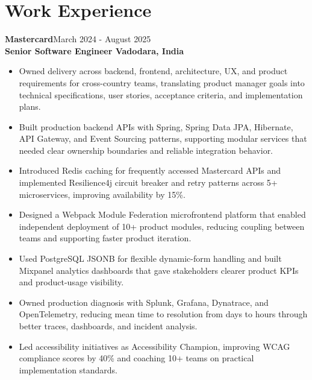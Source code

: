 \documentclass[10pt,a4paper]{article}
\newcommand{\entry}[4]{%
  \textbf{\color{secondarycolor}#1}\hfill {\small\color{mutedcolor}#2}\\
  \textbf{#3}\hfill {\small\color{mutedcolor}#4}\\[-5pt]
}
\begin{document}
\section*{Work Experience}
\entry{Mastercard}{March 2024 - August 2025}{Senior Software Engineer \textbar{} Vadodara, India}{}
\begin{itemize}
  \item Owned delivery across backend, frontend, architecture, UX, and product requirements for cross-country teams, translating product manager goals into technical specifications, user stories, acceptance criteria, and implementation plans.
  \item Built production backend APIs with Spring, Spring Data JPA, Hibernate, API Gateway, and Event Sourcing patterns, supporting modular services that needed clear ownership boundaries and reliable integration behavior.
  \item Introduced Redis caching for frequently accessed Mastercard APIs and implemented Resilience4j circuit breaker and retry patterns across 5+ microservices, improving availability by 15\%.
  \item Designed a Webpack Module Federation microfrontend platform that enabled independent deployment of 10+ product modules, reducing coupling between teams and supporting faster product iteration.
  \item Used PostgreSQL JSONB for flexible dynamic-form handling and built Mixpanel analytics dashboards that gave stakeholders clearer product KPIs and product-usage visibility.
  \item Owned production diagnosis with Splunk, Grafana, Dynatrace, and OpenTelemetry, reducing mean time to resolution from days to hours through better traces, dashboards, and incident analysis.
  \item Led accessibility initiatives as Accessibility Champion, improving WCAG compliance scores by 40\% and coaching 10+ teams on practical implementation standards.
\end{itemize}
\end{document}
